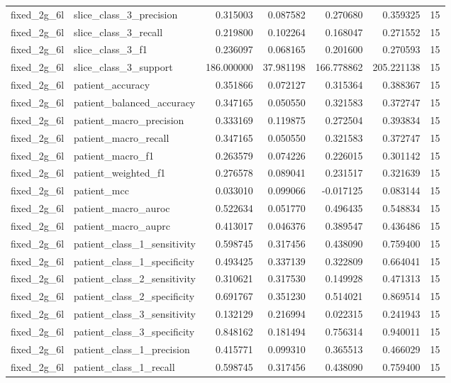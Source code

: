 \begin{tabular}{llrrrrr}
fixed_2g_6l & slice_class_3_precision & 0.315003 & 0.087582 & 0.270680 & 0.359325 & 15 \\
fixed_2g_6l & slice_class_3_recall & 0.219800 & 0.102264 & 0.168047 & 0.271552 & 15 \\
fixed_2g_6l & slice_class_3_f1 & 0.236097 & 0.068165 & 0.201600 & 0.270593 & 15 \\
fixed_2g_6l & slice_class_3_support & 186.000000 & 37.981198 & 166.778862 & 205.221138 & 15 \\
fixed_2g_6l & patient_accuracy & 0.351866 & 0.072127 & 0.315364 & 0.388367 & 15 \\
fixed_2g_6l & patient_balanced_accuracy & 0.347165 & 0.050550 & 0.321583 & 0.372747 & 15 \\
fixed_2g_6l & patient_macro_precision & 0.333169 & 0.119875 & 0.272504 & 0.393834 & 15 \\
fixed_2g_6l & patient_macro_recall & 0.347165 & 0.050550 & 0.321583 & 0.372747 & 15 \\
fixed_2g_6l & patient_macro_f1 & 0.263579 & 0.074226 & 0.226015 & 0.301142 & 15 \\
fixed_2g_6l & patient_weighted_f1 & 0.276578 & 0.089041 & 0.231517 & 0.321639 & 15 \\
fixed_2g_6l & patient_mcc & 0.033010 & 0.099066 & -0.017125 & 0.083144 & 15 \\
fixed_2g_6l & patient_macro_auroc & 0.522634 & 0.051770 & 0.496435 & 0.548834 & 15 \\
fixed_2g_6l & patient_macro_auprc & 0.413017 & 0.046376 & 0.389547 & 0.436486 & 15 \\
fixed_2g_6l & patient_class_1_sensitivity & 0.598745 & 0.317456 & 0.438090 & 0.759400 & 15 \\
fixed_2g_6l & patient_class_1_specificity & 0.493425 & 0.337139 & 0.322809 & 0.664041 & 15 \\
fixed_2g_6l & patient_class_2_sensitivity & 0.310621 & 0.317530 & 0.149928 & 0.471313 & 15 \\
fixed_2g_6l & patient_class_2_specificity & 0.691767 & 0.351230 & 0.514021 & 0.869514 & 15 \\
fixed_2g_6l & patient_class_3_sensitivity & 0.132129 & 0.216994 & 0.022315 & 0.241943 & 15 \\
fixed_2g_6l & patient_class_3_specificity & 0.848162 & 0.181494 & 0.756314 & 0.940011 & 15 \\
fixed_2g_6l & patient_class_1_precision & 0.415771 & 0.099310 & 0.365513 & 0.466029 & 15 \\
fixed_2g_6l & patient_class_1_recall & 0.598745 & 0.317456 & 0.438090 & 0.759400 & 15 \\

\end{tabular}
